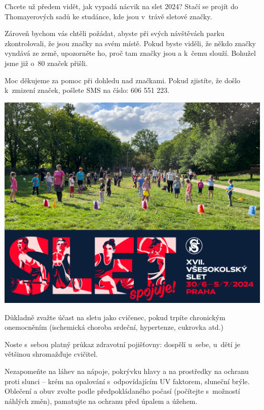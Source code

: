 \documentclass[11pt]{article}
\begin{document}
\clearpage

Chcete už předem vidět, jak vypadá nácvik na slet 2024? Stačí se projít do Thomayerových sadů ke studánce, kde jsou v~trávě sletové značky. 

Zároveň bychom vás chtěli požádat, abyste při svých návštěvách parku zkontrolovali, že jsou značky na svém místě.
Pokud byste viděli, že někdo značky vyndává ze země, upozorněte ho, proč tam značky jsou a k~čemu slouží. Bohužel jsme již o~80 značek přišli.

Moc děkujeme za pomoc při dohledu nad značkami. Pokud zjistíte, že došlo k~zmizení značek, pošlete SMS na číslo: 606 551 223.

\vspace*{\baselineskip}

\begin{center}
  \includegraphics*[width=\textwidth]{thomayerovy-sady.jpg}
\end{center}

\clearpage
{}
\vspace*{-24pt}

Důkladně zvažte účast na sletu jako cvičenec, pokud trpíte chronickým onemocněním (ischemická choroba srdeční, hypertenze, cukrovka atd.)

Noste s~sebou platný průkaz zdravotní pojišťovny: dospělí u~sebe, u~dětí je většinou shromažďuje cvičitel.

Nezapomeňte na láhev na nápoje, pokrývku hlavy a na prostředky na ochranu proti slunci – krém na opalování s~odpovídajícím UV faktorem, sluneční brýle.
Oblečení a obuv zvolte podle předpokládaného počasí (počítejte s~možností náhlých změn), pamatujte na ochranu před úpalem a úžehem.
\end{document}
